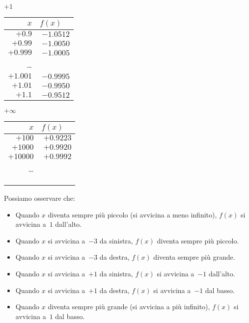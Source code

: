 \begin{esempio}
\begin{minipage}{.24\textwidth}
\begin{center}
\(+1\)\\
\begin{tabular}{r|r}
\(x\) & \(f(x)\quad\)\\\hline
\(+0.9\) & \(-1.0512\)\\
\(+0.99\) & \(-1.0050\) \\
\(+0.999\) & \(-1.0005\) \\
\dots \\
\(+1.001\) & \(-0.9995\) \\
\(+1.01\) & \(-0.9950\) \\
\(+1.1\) & \(-0.9512\) \\
\end{tabular}
\end{center}
\end{minipage}
\begin{minipage}{.24\textwidth}
\begin{center}
\(+\infty\)\\
\begin{tabular}{r|r}
\(x\) & \(f(x)\quad\)\\\hline
\(+100\) & \(+0.9223\) \\
\(+1000\) & \(+0.9920\) \\
\(+10000\) & \(+0.9992\) \\
\dots \\
&\\
&\\
&
\end{tabular}
\end{center}
\end{minipage}
Possiamo osservare che:
\begin{itemize} [nosep]
 \item Quando \(x\) diventa sempre più piccolo 
 (si avvicina a meno infinito), 
\(f(x)\) si avvicina a~\(1\) dall'alto.
 \item Quando \(x\) si avvicina a~\(-3\) da sinistra, 
\(f(x)\) diventa sempre più piccolo.
 \item Quando \(x\) si avvicina a~\(-3\) da destra, 
\(f(x)\) diventa sempre più grande.
 \item Quando \(x\) si avvicina a~\(+1\) da sinistra, 
\(f(x)\)  si avvicina a~\(-1\) dall'alto.
 \item Quando \(x\) si avvicina a~\(+1\) da destra, 
\(f(x)\)  si avvicina a~\(-1\) dal basso.
 \item Quando \(x\) diventa sempre più grande 
 (si avvicina a più infinito), 
\(f(x)\) si avvicina a~\(1\) dal basso.
\end{itemize}
\begin{center}\scalebox{.6}{\limitigraficoa}\end{center}
\end{esempio}

